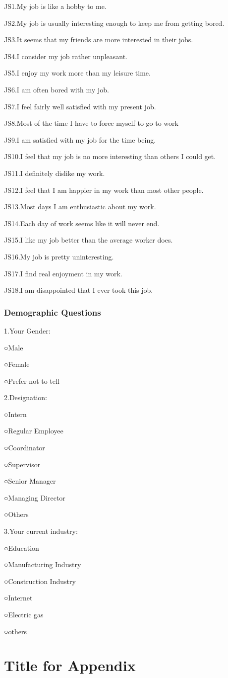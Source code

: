 \documentclass[
  man,
  longtable,
  nolmodern,
  notxfonts,
  notimes,
  colorlinks=true,linkcolor=blue,citecolor=blue,urlcolor=blue]{apa7}
\begin{document}
JS1.My job is like a hobby to me.

JS2.My job is usually interesting enough to keep me from getting bored.

JS3.It seems that my friends are more interested in their jobs.

JS4.I consider my job rather unpleasant.

JS5.I enjoy my work more than my leisure time.

JS6.I am often bored with my job.

JS7.I feel fairly well satisfied with my present job.

JS8.Most of the time I have to force myself to go to work

JS9.I am satisfied with my job for the time being.

JS10.I feel that my job is no more interesting than others I could get.

JS11.I definitely dislike my work.

JS12.I feel that I am happier in my work than most other people.

JS13.Most days I am enthusiastic about my work.

JS14.Each day of work seems like it will never end.

JS15.I like my job better than the average worker does.

JS16.My job is pretty uninteresting.

JS17.I find real enjoyment in my work.

JS18.I am disappointed that I ever took this job.

\subsubsection{Demographic Questions}\label{demographic-questions}

1.Your Gender:

○Male

○Female

○Prefer not to tell

2.Designation:

○Intern

○Regular Employee

○Coordinator

○Supervisor

○Senior Manager

○Managing Director

○Others

3.Your current industry:

○Education

○Manufacturing Industry

○Construction Industry

○Internet

○Electric gas

○others

\section{Title for Appendix}\label{title-for-appendix}
\end{document}
